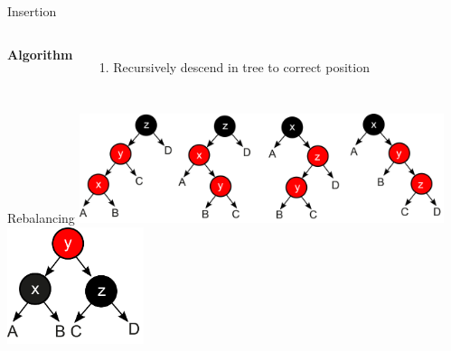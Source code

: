 \begin{frame}{Insertion}
\begin{columns}[T]
\textbf{Algorithm}
\begin{enumerate}
  \item Recursively descend in tree to correct position
\end{enumerate}

\centering
{}
\end{columns}
\end{frame}

\begin{frame}{Rebalancing}
  \centering
  \includegraphics[width=0.8\textwidth]{img/rbtree_cases.png}
  \vfill
  \includegraphics[width=0.3\textwidth]{img/rbtree_solution.png}
\end{frame}

